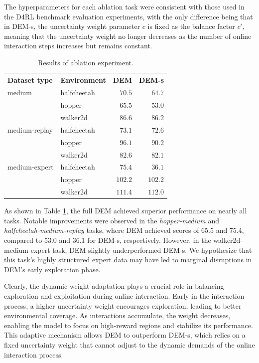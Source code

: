 \documentclass[letterpaper]{article} %
\begin{document}
The hyperparameters for each ablation task were consistent with those used in the D4RL benchmark evaluation experiments, with the only difference being that in DEM-s, the uncertainty weight parameter $c$ is fixed as the balance factor $c'$, meaning that the uncertainty weight no longer decreases as the number of online interaction steps increases but remains constant.

\begin{table}
  \centering
  \begin{tabular}{llrr}
    \toprule
    \textbf{Dataset type} & \textbf{Environment} & \textbf{DEM} & \textbf{DEM-s} \\
    \midrule
    medium        & halfcheetah & $\mathbf{70.5}$ & $64.7$ \\
                  & hopper & $\mathbf{65.5}$ & $53.0$ \\
                  & walker2d & $\mathbf{86.6}$ & $86.2$  \\
    medium-replay & halfcheetah & $\mathbf{73.1}$ & $72.6$ \\
                  & hopper & $\mathbf{96.1}$ & $90.2$ \\
                  & walker2d & $\mathbf{82.6}$ & $82.1$ \\
    medium-expert & halfcheetah & $\mathbf{75.4}$ & $36.1$ \\
                  & hopper & $102.2$ & $102.2$ \\
                  & walker2d & $111.4$ & $\mathbf{112.0}$ \\
    \bottomrule
  \end{tabular}
  \caption{Results of ablation experiment.}
  \label{tab:ablation}
\end{table}

As shown in Table \ref{tab:ablation}, the full DEM achieved superior performance on nearly all tasks. Notable improvements were observed in the \textit{hopper-medium} and \textit{halfcheetah-medium-replay} tasks, where DEM achieved scores of 65.5 and 75.4, compared to 53.0 and 36.1 for DEM-s, respectively. However, in the walker2d-medium-expert task, DEM slightly underperformed DEM-s. We hypothesize that this task's highly structured expert data may have led to marginal disruptions in DEM's early exploration phase.

Clearly, the dynamic weight adaptation plays a crucial role in balancing exploration and exploitation during online interaction. Early in the interaction process, a higher uncertainty weight encourages exploration, leading to better environmental coverage. As interactions accumulate, the weight decreases, enabling the model to focus on high-reward regions and stabilize its performance. This adaptive mechanism allows DEM to outperform DEM-s, which relies on a fixed uncertainty weight that cannot adjust to the dynamic demands of the online interaction process.
\end{document}
